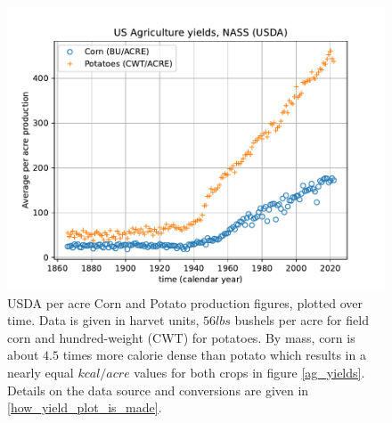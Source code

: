 \documentclass[12pt]{iopart}
\begin{document}
\begin{figure}[ht!]
\centering
\includegraphics[width=\columnwidth]{corn_potatoes_raw_production_per_acre.pdf}
\caption{
USDA per acre Corn and Potato production figures, plotted over time.  Data is given in harvet units, $56lbs$ bushels per acre for field corn and hundred-weight (CWT) for potatoes.  By mass, corn is about $4.5$ times more calorie dense than potato which results in a nearly equal $kcal/acre$ values for both crops in figure \ref{ag_yields}.
Details on the data source and conversions are given in \ref{how_yield_plot_is_made}.
}
\label{corn_and_potato_yields}
\end{figure}
\end{document}
